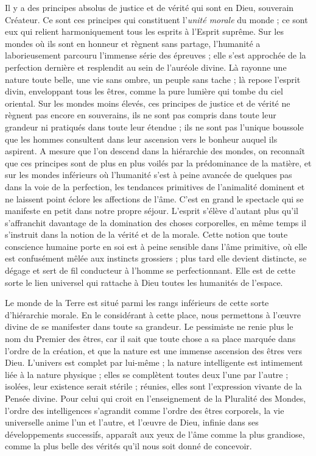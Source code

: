 \documentclass[a4paper, 11pt, oneside]{article}
\begin{document}
Il y a des principes absolus de justice et de vérité qui sont en Dieu, souverain Créateur. Ce sont ces principes qui constituent l'\emph{unité morale} du monde ; ce sont eux qui relient harmoniquement tous les esprits à l'Esprit suprême. Sur les mondes où ils sont en honneur et règnent sans partage, l'humanité a laborieusement parcouru l'immense série des épreuves ; elle s'est approchée de la perfection dernière et resplendit au sein de l'auréole divine. Là rayonne une nature toute belle, une vie sans ombre, un peuple sans tache ; là repose l'esprit divin, enveloppant tous les êtres, comme la pure lumière qui tombe du ciel oriental. Sur les mondes moins élevés, ces principes de justice et de vérité ne règnent pas encore en souverains, ils ne sont pas compris dans toute leur grandeur ni pratiqués dans toute leur étendue ; ils ne sont pas l'unique boussole que les hommes consultent dans leur ascension vers le bonheur auquel ils aspirent. A mesure que l'on descend dans la hiérarchie des mondes, on reconnaît que ces principes sont de plus en plus voilés par la prédominance de la matière, et sur les mondes inférieurs où l'humanité s'est à peine avancée de quelques pas dans la voie de la perfection, les tendances primitives de l'animalité dominent et ne laissent point éclore les affections de l'âme. C'est en grand le spectacle qui se manifeste en petit dans notre propre séjour. L'esprit s'élève d'autant plus qu'il s'affranchit davantage de la domination des choses corporelles, en même temps il s'instruit dans la notion de la vérité et de la morale. Cette notion que toute conscience humaine porte en soi est à peine sensible dans l'âme primitive, où elle est confusément mêlée aux instincts grossiers ; plus tard elle devient distincte, se dégage et sert de fil conducteur à l'homme se perfectionnant. Elle est de cette sorte le lien universel qui rattache à Dieu toutes les humanités de l'espace.

Le monde de la Terre est situé parmi les rangs inférieurs de cette sorte d'hiérarchie morale. En le considérant à cette place, nous permettons à l'œuvre divine de se manifester dans toute sa grandeur. Le pessimiste ne renie plus le nom du Premier des êtres, car il sait que toute chose a sa place marquée dans l'ordre de la création, et que la nature est une immense ascension des êtres vers Dieu. L'univers est complet par lui-même ; la nature intelligente est intimement liée à la nature physique ; elles se complètent toutes deux l'une par l'autre ; isolées, leur existence serait stérile ; réunies, elles sont l'expression vivante de la Pensée divine. Pour celui qui croit en l'enseignement de la Pluralité des Mondes, l'ordre des intelligences s'agrandit comme l'ordre des êtres corporels, la vie universelle anime l'un et l'autre, et l'œuvre de Dieu, infinie dans ses développements successifs, apparaît aux yeux de l'âme comme la plus grandiose, comme la plus belle des vérités qu'il nous soit donné de concevoir.
\clearpage
\end{document}
